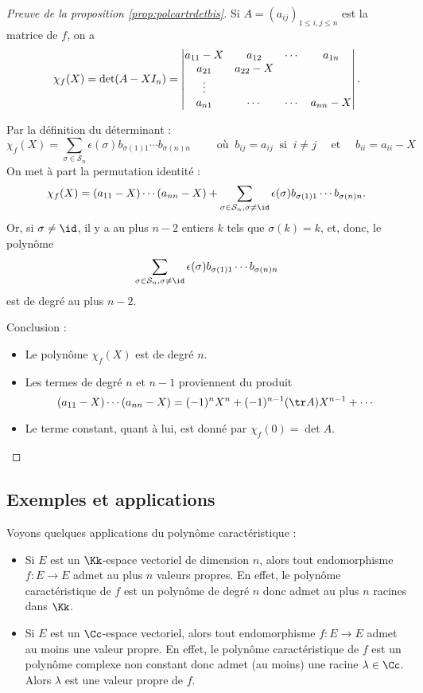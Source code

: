 \documentclass[12pt, class=report,crop=false]{standalone}
\begin{document}



\begin{proof}[Preuve de la proposition \ref{prop:polcartrdetbis}]
Si $A=(a_{ij})_{1\le i,j\le n}$ est la matrice de $f$, on a
$$\chi_f(X) = \det(A-XI_n) 
= \begin{vmatrix}a_{11}-X&a_{12}&\cdots&a_{1n}\cr a_{21}&a_{22}-X& & \cr
\vdots& & & \cr a_{n1}&\cdots &\cdots&a_{nn}-X\end{vmatrix}.$$

Par la définition du déterminant :
$$\chi_f(X) = \sum_{\sigma\in \mathcal{S}_n}\epsilon(\sigma)b_{\sigma(1)1}\cdots b_{\sigma(n)n}
\qquad  \text{ où } \  b_{ij}=a_{ij} \ \text{ si } \ i\neq j \quad \text{ et } \quad b_{ii}=a_{ii}-X$$
On met à part la permutation identité :
$$\chi_f(X) = (a_{11}-X)\cdots(a_{nn}-X)
+\sum_{\sigma\in \mathcal{S}_n,\sigma\neq\id}\epsilon(\sigma)b_{\sigma(1)1}\cdots b_{\sigma(n)n}.$$
Or, si $\sigma\neq\id$, il y a au plus $n-2$ entiers $k$ tels que $\sigma(k)=k$, et, donc, le polynôme
$$\sum_{\sigma\in \mathcal{S}_n,\sigma\neq\id}\epsilon(\sigma)b_{\sigma(1)1}\cdots b_{\sigma(n)n}$$
est de degré au plus $n-2$.

Conclusion :
\begin{itemize}
  \item Le polynôme $\chi_f(X)$ est de degré $n$.
  \item Les termes de degré $n$ et $n-1$ proviennent du produit 
$$(a_{11}-X)\cdots(a_{nn}-X)=(-1)^nX^n+(-1)^{n-1}(\tr A)X^{n-1}+\cdots$$   
  \item Le terme constant, quant à lui, est donné par $\chi_f(0)=\det A$.
\end{itemize}
\end{proof}

\subsection{Exemples et applications}

Voyons quelques applications du polynôme caractéristique :

\begin{itemize}  
  \item Si $E$ est un $\Kk$-espace vectoriel de dimension $n$, alors tout endomorphisme $f :  E \to E$ admet au plus $n$ valeurs propres. En effet, le polynôme caractéristique de $f$ est un polynôme de degré $n$ donc admet au plus $n$ racines dans $\Kk$.

  \item Si $E$ est un $\Cc$-espace vectoriel, alors tout endomorphisme $f :  E \to E$ admet  au moins une valeur propre. En effet, le polynôme caractéristique de $f$ est un polynôme complexe non constant donc admet (au moins) une racine $\lambda\in \Cc$. Alors $\lambda$ est une valeur propre de $f$.
\end{itemize} 
\end{document}
